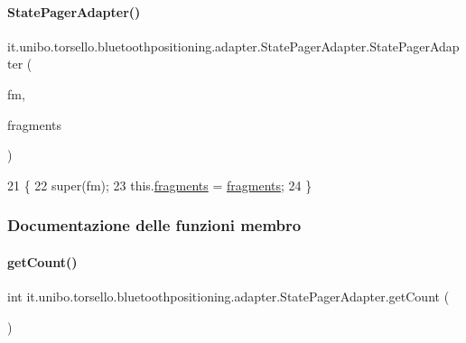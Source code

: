 \paragraph{\texorpdfstring{State\+Pager\+Adapter()}{StatePagerAdapter()}}
{\footnotesize\ttfamily it.\+unibo.\+torsello.\+bluetoothpositioning.\+adapter.\+State\+Pager\+Adapter.\+State\+Pager\+Adapter (\begin{DoxyParamCaption}\item[{Fragment\+Manager}]{fm,  }\item[{Array\+List$<$ Fragment $>$}]{fragments }\end{DoxyParamCaption})}


\begin{DoxyCode}
21                                                                                 \{
22         super(fm);
23         this.\hyperlink{classit_1_1unibo_1_1torsello_1_1bluetoothpositioning_1_1adapter_1_1StatePagerAdapter_a6d30ff8266b65b268d46d03eb30da1db_a6d30ff8266b65b268d46d03eb30da1db}{fragments} = \hyperlink{classit_1_1unibo_1_1torsello_1_1bluetoothpositioning_1_1adapter_1_1StatePagerAdapter_a6d30ff8266b65b268d46d03eb30da1db_a6d30ff8266b65b268d46d03eb30da1db}{fragments};
24     \}
\end{DoxyCode}


\subsubsection{Documentazione delle funzioni membro}
\hypertarget{classit_1_1unibo_1_1torsello_1_1bluetoothpositioning_1_1adapter_1_1StatePagerAdapter_a1c5ec6f7db18de1637281966fae2e0b7_a1c5ec6f7db18de1637281966fae2e0b7}{}\label{classit_1_1unibo_1_1torsello_1_1bluetoothpositioning_1_1adapter_1_1StatePagerAdapter_a1c5ec6f7db18de1637281966fae2e0b7_a1c5ec6f7db18de1637281966fae2e0b7} 
\paragraph{\texorpdfstring{get\+Count()}{getCount()}}
{\footnotesize\ttfamily int it.\+unibo.\+torsello.\+bluetoothpositioning.\+adapter.\+State\+Pager\+Adapter.\+get\+Count (\begin{DoxyParamCaption}{ }\end{DoxyParamCaption})}


